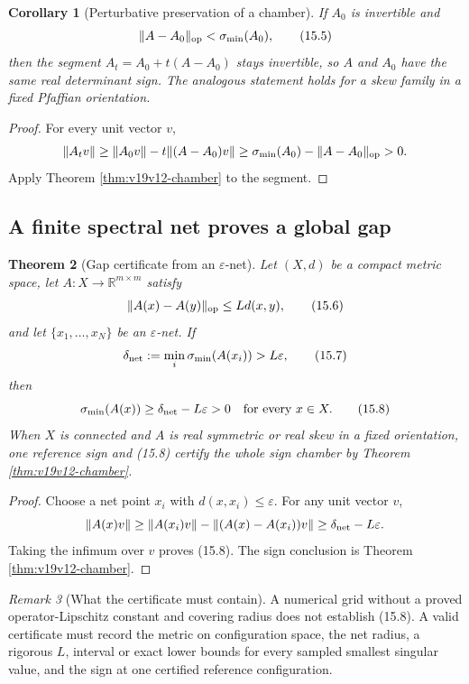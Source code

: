 \documentclass[11pt]{article}
\newtheorem{theorem}{Theorem}[section]
\newtheorem{corollary}[theorem]{Corollary}
\theoremstyle{remark}
\newtheorem{remark}[theorem]{Remark}
\begin{document}
\begin{corollary}[Perturbative preservation of a chamber]
\label{cor:v19v12-perturb}
If \(A_0\) is invertible and
\[
 \|A-A_0\|_{\rm op}<\sigma_{\min}(A_0),                        \tag{15.5}
\]
then the segment \(A_t=A_0+t(A-A_0)\) stays invertible, so \(A\) and
\(A_0\) have the same real determinant sign.  The analogous statement
holds for a skew family in a fixed Pfaffian orientation.
\end{corollary}

\begin{proof}
For every unit vector \(v\),
\[
 \|A_tv\|\geq\|A_0v\|-t\|(A-A_0)v\|
 \geq\sigma_{\min}(A_0)-\|A-A_0\|_{\rm op}>0.
\]
Apply Theorem \ref{thm:v19v12-chamber} to the segment.
\end{proof}

\subsection{A finite spectral net proves a global gap}

\begin{theorem}[Gap certificate from an \(\varepsilon\)-net]
\label{thm:v19v12-net}
Let \((X,d)\) be a compact metric space, let
\(A:X\to\mathbb R^{m\times m}\) satisfy
\[
 \|A(x)-A(y)\|_{\rm op}\leq Ld(x,y),                           \tag{15.6}
\]
and let \(\{x_1,\ldots,x_N\}\) be an \(\varepsilon\)-net.  If
\[
 \delta_{\rm net}:=\min_i\sigma_{\min}(A(x_i))>L\varepsilon,  \tag{15.7}
\]
then
\[
 \sigma_{\min}(A(x))
 \geq\delta_{\rm net}-L\varepsilon>0
 \quad\hbox{for every }x\in X.                                \tag{15.8}
\]
When \(X\) is connected and \(A\) is real symmetric or real skew in a
fixed orientation, one reference sign and (15.8) certify the whole sign
chamber by Theorem \ref{thm:v19v12-chamber}.
\end{theorem}

\begin{proof}
Choose a net point \(x_i\) with \(d(x,x_i)\leq\varepsilon\).  For any unit
vector \(v\),
\[
 \|A(x)v\|
 \geq\|A(x_i)v\|-\|(A(x)-A(x_i))v\|
 \geq\delta_{\rm net}-L\varepsilon.
\]
Taking the infimum over \(v\) proves (15.8).  The sign conclusion is
Theorem \ref{thm:v19v12-chamber}.
\end{proof}

\begin{remark}[What the certificate must contain]
\label{rem:v19v12-certificate}
A numerical grid without a proved operator-Lipschitz constant and covering
radius does not establish (15.8).  A valid certificate must record the
metric on configuration space, the net radius, a rigorous \(L\), interval
or exact lower bounds for every sampled smallest singular value, and
the sign at one certified reference configuration.
\end{remark}
\end{document}
